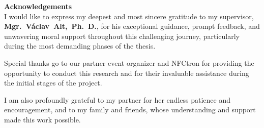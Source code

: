 \newpage
\pagestyle{empty}

\noindent
{\large\bfseries Acknowledgements}\\

\noindent
I would like to express my deepest and most sincere gratitude to my supervisor, \textbf{Mgr.~Václav~Alt,~Ph.~D.}, for his exceptional guidance, prompt feedback,
and unwavering moral support throughout this challenging journey, particularly during the most demanding phases of the thesis.

Special thanks go to our partner event organizer and NFCtron for providing the opportunity to conduct this research and for their invaluable assistance during the initial stages of the project.

I am also profoundly grateful to my partner for her endless patience and encouragement, and to my family and friends, whose understanding and support made this work possible.